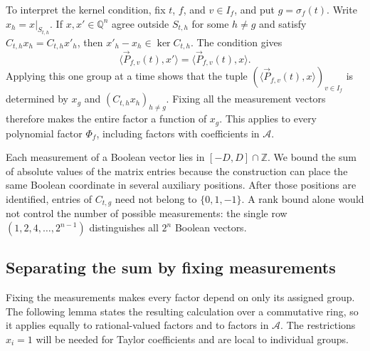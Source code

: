 To interpret the kernel condition, fix $t$, $f$, and $v\in I_f$,
and put $g=\sigma_f(t)$. Write $x_h=x|_{S_{t,h}}$.
If $x,x'\in\mathbb Q^n$ agree outside $S_{t,h}$ for some $h\ne g$
and satisfy $C_{t,h}x_h=C_{t,h}x'_h$, then
$x'_h-x_h\in\ker C_{t,h}$. The condition gives
\[
 \langle \vec{P}_{f,v}(t), x'\rangle=\langle \vec{P}_{f,v}(t), x\rangle.
\]
Applying this one group at a time shows that the tuple
$(\langle \vec{P}_{f,v}(t), x\rangle)_{v\in I_f}$ is determined by $x_g$ and
$(C_{t,h}x_h)_{h\ne g}$. Fixing all the measurement vectors therefore
makes the entire factor a function of $x_g$. This applies to every
polynomial factor $\Phi_f$, including factors with coefficients in
$\mathcal A$.

Each measurement of a Boolean vector lies in $[-D,D]\cap\mathbb Z$.
We bound the sum of absolute values of the matrix entries because
the construction can place the same Boolean coordinate in several
auxiliary positions. After those positions are identified, entries
of $C_{t,g}$ need not belong to $\{0,1,-1\}$. A rank bound alone
would not control the number of possible measurements: the single
row $(1,2,4,\ldots,2^{n-1})$ distinguishes all $2^n$ Boolean vectors.

\subsection{Separating the sum by fixing measurements}
\label{subsec:measurement-factorization}
Fixing the measurements makes every factor depend on only its assigned
group. The following lemma states the resulting calculation over a
commutative ring, so it applies equally to rational-valued factors and
to factors in $\mathcal A$. The restrictions $x_i=1$ will be needed
for Taylor coefficients and are local to individual groups.

